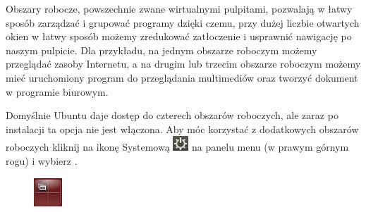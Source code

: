 Obszary robocze, powszechnie zwane wirtualnymi pulpitami, pozwalają w łatwy sposób zarządzać i grupować programy dzięki czemu, przy dużej liczbie otwartych okien w łatwy sposób możemy zredukować zatłoczenie i usprawnić nawigację po naszym pulpicie. Dla przykładu, na jednym obszarze roboczym możemy przeglądać zasoby Internetu, a na drugim lub trzecim obszarze roboczym możemy mieć uruchomiony program do przeglądania multimediów oraz tworzyć dokument w programie biurowym.

Domyślnie Ubuntu daje dostęp do czterech obszarów roboczych, ale zaraz po instalacji ta opcja nie jest włączona. Aby móc korzystać z dodatkowych obszarów roboczych kliknij na ikonę Systemową \includegraphics{images/ikony_zasilanie.png} na panelu menu (w prawym górnym rogu) i wybierz .

\begin{figure}
	\vspace{-10pt}
	\includegraphics[width=\linewidth]{images/ikony_obszary_robocze.png}
\end{figure}

